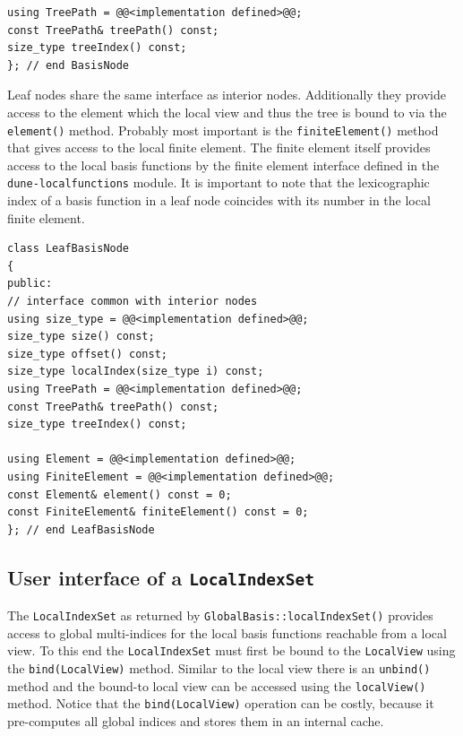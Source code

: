 \documentclass[a4paper,10pt,headings=normal,bibliography=totoc]{scrartcl}
\newcommand{\cpp}[1]{\lstinline[basicstyle=\ttfamily]!#1!}
\newcommand{\dunemodule}[1]{\texttt{#1}}
\begin{document}
\begin{lstlisting}[style=Interface]
using TreePath = @@<implementation defined>@@;
const TreePath& treePath() const;
size_type treeIndex() const;
}; // end BasisNode
\end{lstlisting}

Leaf nodes share the same interface as interior
nodes. Additionally they provide access to the
element which the local view and thus the tree is bound
to via the \cpp{element()} method. Probably most important
is the \cpp{finiteElement()} method that gives access
to the local finite element. The finite element
itself provides access to the local basis functions
by the finite element interface defined in the
\dunemodule{dune-localfunctions} module.
It is important to note that the lexicographic
index of a basis function in a leaf node coincides
with its number in the local finite element.

\begin{lstlisting}[style=Interface]
class LeafBasisNode
{
public:
// interface common with interior nodes
using size_type = @@<implementation defined>@@;
size_type size() const;
size_type offset() const;
size_type localIndex(size_type i) const;
using TreePath = @@<implementation defined>@@;
const TreePath& treePath() const;
size_type treeIndex() const;

using Element = @@<implementation defined>@@;
using FiniteElement = @@<implementation defined>@@;
const Element& element() const = 0;
const FiniteElement& finiteElement() const = 0;
}; // end LeafBasisNode
\end{lstlisting}



\subsection{User interface of a \texorpdfstring{\cpp{LocalIndexSet}}{LocalIndexSet}}
\label{sec:localindexset_interface}

The \cpp{LocalIndexSet} as returned by \cpp{GlobalBasis::localIndexSet()}
provides access to global multi-indices for the
local basis functions reachable from a local view.
To this end the \cpp{LocalIndexSet} must
first be bound to the \cpp{LocalView} using
the \cpp{bind(LocalView)} method. Similar to the
local view there is an \cpp{unbind()} method
and the bound-to local view can be accessed
using the \cpp{localView()} method.
Notice that the \cpp{bind(LocalView)} operation
can be costly, because it pre-computes
all global indices and stores them in an internal cache.
\end{document}
